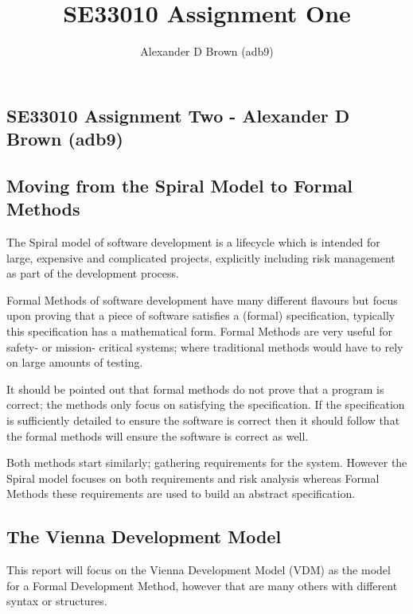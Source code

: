 \documentclass[a4paper, notitlepage, fleqn]{article}
\title{SE33010 Assignment One}
\author{Alexander D Brown (adb9)}
\begin{document}
\begin{centering}
\section*{SE33010 Assignment Two - Alexander D Brown (adb9)}
\subsection*{Moving from the Spiral Model to Formal Methods}
\end{centering}

The Spiral model of software development is a lifecycle which is intended for large, expensive and
complicated projects, explicitly including risk management as part of the development process.


Formal Methods of software development have many different flavours but focus upon proving that a
piece of software satisfies a (formal) specification, typically this specification has a 
mathematical form. Formal Methods are very useful for safety- or mission- critical systems; where
traditional methods would have to rely on large amounts of testing.

It should be pointed out that formal methods do not prove that a program is correct; the methods
only focus on satisfying the specification. If the specification is sufficiently detailed to
ensure the software is correct then it should follow that the formal methods will ensure the
software is correct as well.

Both methods start similarly; gathering requirements for the system. However the Spiral model 
focuses on both requirements and risk analysis whereas Formal Methods these requirements are used
to build an abstract specification.\\

\subsection*{The Vienna Development Model}

This report will focus on the Vienna Development Model (VDM) as the model for a Formal Development
Method, however that are many others with different syntax or structures.
\end{document}
